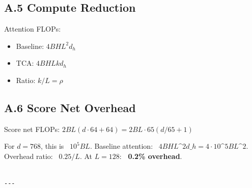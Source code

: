 \subsection{A.5 Compute Reduction}

Attention FLOPs:
\begin{itemize}
\item Baseline: $4 B H L^2 d_h$
\item TCA: $4 B H L k d_h$
\item Ratio: $k/L = \rho$

\end{itemize}
\subsection{A.6 Score Net Overhead}

Score net FLOPs: $2 B L (d \cdot 64 + 64) = 2 B L \cdot 65 (d/65 + 1)$

For $d = 768$, this is ~$10^5 B L$. Baseline attention: ~$4 B H L\^{}2 d\_h = 
4 \cdot 10\^{}5 B L\^{}2$. Overhead ratio: ~$0.25 / L$. At $L = 128$: \textbf{~0.2\% overhead}.
\begin{lstlisting}

---
\end{lstlisting}